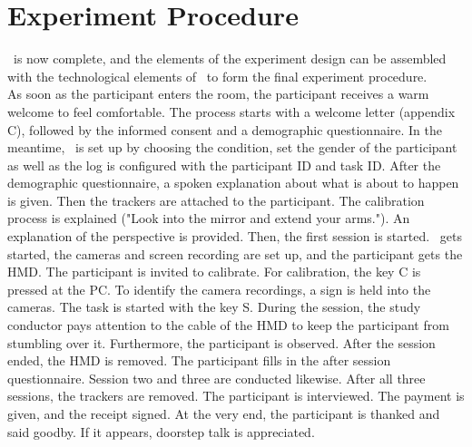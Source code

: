 \section{Experiment Procedure}
\label{sec:procedure}
\exgo\ is now complete, and the elements of the experiment design can be assembled with the technological elements of \exgo\ to form the final experiment procedure.\\
As soon as the participant enters the room, the participant receives a warm welcome to feel comfortable. The process starts with a welcome letter (appendix C), followed by the informed consent and a demographic questionnaire. In the meantime, \exgo\ is set up by choosing the condition, set the gender of the participant as well as the log is configured with the participant ID and task ID. After the demographic questionnaire, a spoken explanation about what is about to happen is given. Then the trackers are attached to the participant. The calibration process is explained ("Look into the mirror and extend your arms."). An explanation of the perspective is provided. Then, the first session is started. \exgo\ gets started, the cameras and screen recording are set up, and the participant gets the HMD. The participant is invited to calibrate. For calibration, the key C is pressed at the PC. To identify the camera recordings, a sign is held into the cameras. The task is started with the key S. During the session, the study conductor pays attention to the cable of the HMD to keep the participant from stumbling over it. Furthermore, the participant is observed. After the session ended, the HMD is removed. The participant fills in the after session questionnaire. Session two and three are conducted likewise. After all three sessions, the trackers are removed. The participant is interviewed. The payment is given, and the receipt signed. At the very end, the participant is thanked and said goodby. If it appears, doorstep talk is appreciated.

